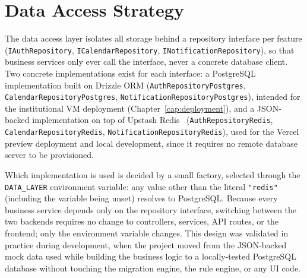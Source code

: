 \section{Data Access Strategy} \label{sec:data-access}

The data access layer isolates all storage behind a repository interface per feature (\texttt{IAuthRepository}, \texttt{ICalendarRepository}, \texttt{INotificationRepository}), so that business services only ever call the interface, never a concrete database client. Two concrete implementations exist for each interface: a PostgreSQL implementation built on Drizzle ORM (\texttt{AuthRepositoryPostgres}, \texttt{CalendarRepositoryPostgres}, \texttt{NotificationRepositoryPostgres}), intended for the institutional VM deployment (Chapter~\ref{cap:deployment}), and a JSON-backed implementation on top of Upstash Redis~\cite{upstashredis} (\texttt{AuthRepositoryRedis}, \texttt{CalendarRepositoryRedis}, \texttt{NotificationRepositoryRedis}), used for the Vercel~\cite{vercel} preview deployment and local development, since it requires no remote database server to be provisioned.

Which implementation is used is decided by a small factory, selected through the \texttt{DATA\_LAYER} environment variable: any value other than the literal \texttt{"redis"} (including the variable being unset) resolves to PostgreSQL. Because every business service depends only on the repository interface, switching between the two backends requires no change to controllers, services, API routes, or the frontend; only the environment variable changes. This design was validated in practice during development, when the project moved from the JSON-backed mock data used while building the business logic to a locally-tested PostgreSQL database without touching the migration engine, the rule engine, or any UI code.
